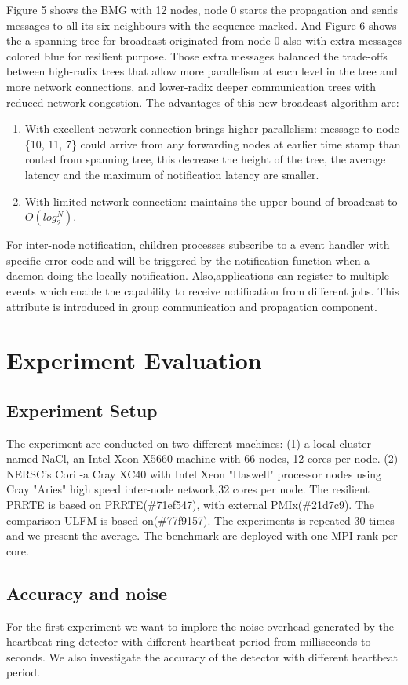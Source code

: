 \documentclass[sigconf]{acmart}
\begin{document}
Figure 5 shows the BMG with 12 nodes, node 0 starts the propagation and sends messages to all its six neighbours with the sequence marked. And Figure 6 shows the a spanning tree for broadcast originated from node 0 also with extra messages colored blue for resilient purpose. Those extra messages balanced the trade-offs between high-radix trees that allow more parallelism at each level in the tree and more network connections, and lower-radix deeper communication trees with reduced network congestion. The advantages of this new broadcast algorithm are:
\begin{enumerate}
  \item With excellent network connection brings higher parallelism: message to node \{10, 11, 7\} could arrive from any forwarding nodes at earlier time stamp than routed from spanning tree, this decrease the height of the tree, the average latency and the maximum of notification latency are smaller.
  \item With limited network connection: maintains the upper bound of broadcast to $O(log_2^{N})$. 
\end{enumerate}
For inter-node notification, children processes subscribe to a event handler with specific error code and will be triggered by the notification function when a daemon doing the locally notification. Also,applications can register to multiple events which enable the capability to receive notification from different jobs. This attribute is introduced in group communication and propagation component.

\section{Experiment Evaluation}

\subsection{Experiment Setup}
The experiment are conducted on two different machines: (1) a local cluster named NaCl, an Intel Xeon X5660 machine with 66 nodes, 12 cores per node. (2) NERSC's Cori\cite{Cori01} -a Cray XC40 with Intel Xeon "Haswell" processor nodes using Cray "Aries" high speed inter-node network,32 cores per node. The resilient PRRTE is based on PRRTE(\#71ef547), with external PMIx(\#21d7c9). The comparison ULFM is based on(\#77f9157). The experiments is repeated 30 times and we present the average. The benchmark are deployed with one MPI rank per core. 
\subsection{Accuracy and noise}
For the first experiment we want to implore the noise overhead generated by the heartbeat ring detector with different heartbeat period from milliseconds to seconds. We also investigate the accuracy of the detector with different heartbeat period. 
\end{document}
